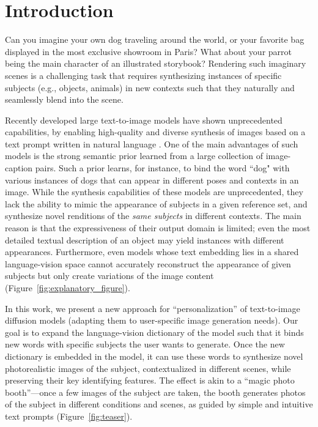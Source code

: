 \section{Introduction}

Can you imagine your own dog traveling around the world, or your favorite bag displayed in the most exclusive showroom in Paris? What about your parrot being the main character of an illustrated storybook?
Rendering such imaginary scenes is a challenging task that requires synthesizing instances of specific subjects (e.g., objects, animals) in new contexts such that they naturally and seamlessly blend into the scene.

Recently developed large text-to-image models have shown unprecedented capabilities, by enabling high-quality and diverse synthesis of images based on a text prompt written in natural language \cite{saharia2022photorealistic,ramesh2022hierarchical}. One of the main advantages of such models is the strong semantic prior learned from a large collection of image-caption pairs. Such a prior learns, for instance, to bind the word ``dog" with various instances of dogs that can appear in different poses and contexts in an image.  
While the synthesis capabilities of these models are unprecedented, they lack the ability to mimic the appearance of subjects in a given reference set, and synthesize novel renditions of the \emph{same subjects} in different contexts. The main reason is that the expressiveness of their output domain is limited;  even the most detailed textual description of an object may yield instances with different appearances. Furthermore, even models whose text embedding lies in a shared language-vision space \cite{radford2021learning} cannot accurately reconstruct the appearance of given subjects but only create variations of the image content (Figure~\ref{fig:explanatory_figure}). 

In this work, we present a new approach for ``personalization'' of text-to-image diffusion models (adapting them to user-specific image generation needs). Our goal is to expand the language-vision dictionary of the model such that it binds new words with specific subjects the user wants to generate. Once the new dictionary is embedded in the model, it can use these words to synthesize novel photorealistic images of the subject, contextualized in different scenes, while preserving their key identifying features. The effect is akin to a ``magic photo booth''---once a few images of the subject are taken, the booth generates photos of the subject in different conditions and scenes, as guided by simple and intuitive text prompts (Figure~\ref{fig:teaser}).

